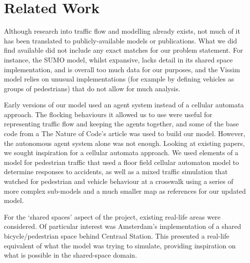 \chapter{Related Work} \label{chap:related}

Although research into traffic flow and modelling already exists, not much of it has been translated to publicly-available models or publications. What we did find available did not include any exact matches for our problem statement. For instance, the SUMO model, whilst expansive, lacks detail in its shared space implementation, and is overall too much data for our purposes\cite{krajzewicz2014}, and the Vissim model relies on unusual implementations (for example by defining vehicles as groups of pedestrians) that do not allow for much analysis\cite{kupferschmid2016}.

Early versions of our model used an agent system instead of a cellular automata approach. The flocking behaviours it allowed us to use were useful for representing traffic flow and keeping the agents together, and some of the base code from a The Nature of Code's article\cite{shiffman2012} was used to build our model. However, the autonomous agent system alone was not enough. Looking at existing papers, we sought inspiration for a cellular automata approach. We used elements of a model for pedestrian traffic\cite{min2017} that used a floor field cellular automaton model to determine responses to accidents, as well as a mixed traffic simulation that watched for pedestrian and vehicle behaviour at a crosswalk using a series of more complex sub-models and a much smaller map\cite{zhang2007} as references for our updated model.

For the `shared spaces' aspect of the project, existing real-life areas were considered. Of particular interest was Amsterdam's implementation of a shared bicycle/pedestrian space behind Centraal Station\cite{kruyswijk2016}. This presented a real-life equivalent of what the model was trying to simulate, providing inspiration on what is possible in the shared-space domain.

